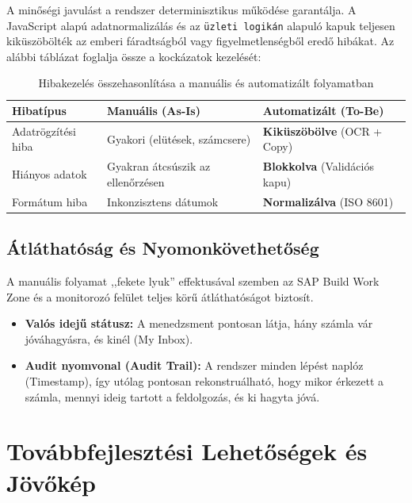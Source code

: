 A minőségi javulást a rendszer determinisztikus működése garantálja. A JavaScript alapú adatnormalizálás és az \texttt{üzleti logikán} alapuló kapuk teljesen kiküszöbölték az emberi fáradtságból vagy figyelmetlenségből eredő hibákat. Az alábbi táblázat foglalja össze a kockázatok kezelését:

\begin{table}[H]
    \centering
    \begin{tabular}{|l|p{5cm}|p{5cm}|}
        \hline
        \textbf{Hibatípus} & \textbf{Manuális (As-Is)} & \textbf{Automatizált (To-Be)} \\ \hline
        Adatrögzítési hiba & Gyakori (elütések, számcsere) & \textbf{Kiküszöbölve} (OCR + Copy) \\ \hline
        Hiányos adatok & Gyakran átcsúszik az ellenőrzésen & \textbf{Blokkolva} (Validációs kapu) \\ \hline
        Formátum hiba & Inkonzisztens dátumok & \textbf{Normalizálva} (ISO 8601) \\ \hline
    \end{tabular}
    \caption{Hibakezelés összehasonlítása a manuális és automatizált folyamatban}
    \label{tab:error_comparison}
\end{table}


\subsection{Átláthatóság és Nyomonkövethetőség}
\label{ssec:eval_transparency}

A manuális folyamat ,,fekete lyuk'' effektusával szemben az SAP Build Work Zone és a monitorozó felület teljes körű átláthatóságot biztosít.
\begin{itemize}
    \item \textbf{Valós idejű státusz:} A menedzsment pontosan látja, hány számla vár jóváhagyásra, és kinél (My Inbox).
    \item \textbf{Audit nyomvonal (Audit Trail):} A rendszer minden lépést naplóz (Timestamp), így utólag pontosan rekonstruálható, hogy mikor érkezett a számla, mennyi ideig tartott a feldolgozás, és ki hagyta jóvá.
\end{itemize}


\section{Továbbfejlesztési Lehetőségek és Jövőkép}
\label{sec:eval_future_work}

